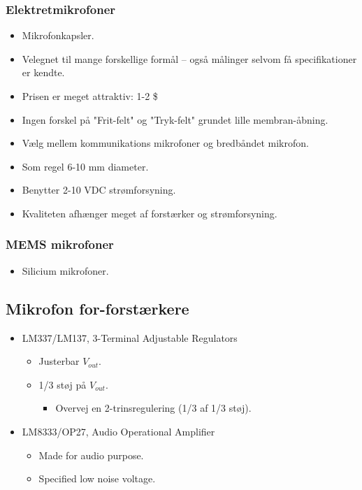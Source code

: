 \subsubsection{Elektretmikrofoner}
\begin{itemize}
	\item Mikrofonkapsler.
	\item Velegnet til mange forskellige formål – også målinger selvom få specifikationer er kendte.
	\item Prisen er meget attraktiv: 1-2 \$
	\item Ingen forskel på "Frit-felt" og "Tryk-felt" grundet lille membran-åbning.
	\item Vælg mellem kommunikations mikrofoner og bredbåndet mikrofon.
	\item Som regel 6-10 \si{\milli\meter} diameter.
	\item Benytter 2-10 VDC strømforsyning.
	\item Kvaliteten afhænger meget af forstærker og strømforsyning.
\end{itemize}

\subsubsection{MEMS mikrofoner}
\begin{itemize}
	\item Silicium mikrofoner.
\end{itemize}

\subsection{Mikrofon for-forstærkere}
\begin{itemize}
	\item LM337/LM137, 3-Terminal Adjustable Regulators
	\begin{itemize}
		\item Justerbar $V_{out}$.
		\item 1/3 støj på $V_{out}$.
		\begin{itemize}
			\item Overvej en 2-trinsregulering (1/3 af 1/3 støj).
		\end{itemize}
	\end{itemize}
	\item LM8333/OP27, Audio Operational Amplifier
	\begin{itemize}
		\item Made for audio purpose.
		\item Specified low noise voltage.
	\end{itemize}
\end{itemize}

